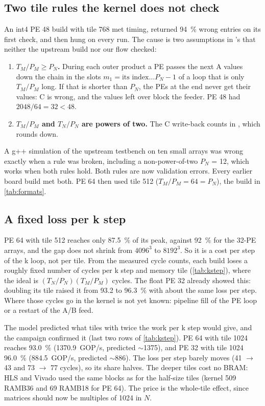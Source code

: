 \subsection{Two tile rules the kernel does not check}
\label{sec:formats:tiles}
An int4 PE 48 build with tile 768 met timing, returned \SI{94}{\percent} wrong entries on its first check,
and then hung on every run. The cause is two assumptions in 's  that neither the
upstream build nor our flow checked:
\begin{enumerate}
  \item \textbf{\(T_M/P_M \ge P_N\).} During each outer product a PE passes the next A values down the chain in the slots
        \(m_1 = \text{its index} \dots P_N-1\) of a loop that is only \(T_M/P_M\) long. If that is shorter than
        \(P_N\), the PEs at the end never get their values: C is wrong, and the values left over block the feeder.
        PE 48 had \(2048/64 = 32 < 48\).
  \item \textbf{\(T_M/P_M\) and \(T_N/P_N\) are powers of two.} The C write-back counts in
        , which rounds down.
\end{enumerate}
A g++ simulation of the upstream testbench on ten small arrays was wrong exactly when a rule was broken, including
a non-power-of-two \(P_N\) = 12, which works when both rules hold. Both rules are now validation errors.
Every earlier board build met both. PE 64 then used tile 512 (\(T_M/P_M = 64 = P_N\)), the build in
\cref{tab:formats}.

\subsection{A fixed loss per k step}
\label{sec:formats:kstep}
PE 64 with tile 512 reaches only \SI{87.5}{\percent} of its peak, against \SI{92}{\percent} for the 32-PE arrays, and the gap
does not shrink from \(4096^3\) to \(8192^3\). So it is a cost per step of the k loop, not per tile. From the measured
cycle counts, each build loses a roughly fixed number of cycles per k step and memory tile
(\cref{tab:kstep}), where the ideal is \((T_N/P_N)(T_M/P_M)\) cycles. The float PE 32 already showed this: doubling
its tile raised it from 93.2 to \SI{96.3}{\percent} with about the same loss per step. Where those cycles go in the
kernel is not yet known: pipeline fill of the PE loop or a restart of the A/B feed.

The model predicted what tiles with twice the work per k step would give, and the  campaign
confirmed it (last two rows of \cref{tab:kstep}). PE 64 with tile 1024 reaches \SI{93.0}{\percent}
(\SI{1370.9}{GOP/s}, predicted \(\sim\)1375), and PE 32 with tile 1024 \SI{96.0}{\percent}
(\SI{884.5}{GOP/s}, predicted \(\sim\)886). The loss per step barely moves (41 \(\to\) 43 and 73 \(\to\) 77
cycles), so its share halves. The deeper tiles cost no BRAM: HLS and Vivado used the same blocks as for the
half-size tiles (kernel 509 RAMB36 and 69 RAMB18 for PE 64). The price is the whole-tile effect, since
matrices should now be multiples of 1024 in \(N\).

